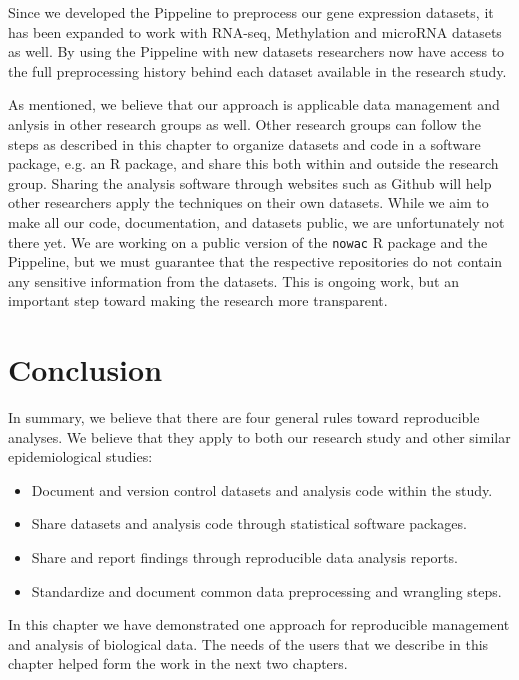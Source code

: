 Since we developed the Pippeline to preprocess our gene expression datasets, it
has been expanded to work with RNA-seq, Methylation and microRNA datasets as
well. By using the Pippeline with new datasets researchers now have access to
the full preprocessing history behind each dataset available in the research
study. 

As mentioned, we believe that our approach is applicable data management and
anlysis in other research groups as well. Other research groups can follow the
steps as described in this chapter to organize datasets and code in a software
package, e.g. an R package, and share this both within and outside the research
group. Sharing the analysis software through websites such as Github will help
other researchers apply the techniques on their own datasets. While we aim to
make all our code, documentation, and datasets public, we are unfortunately not
there yet. We are working on a public version of the \texttt{nowac} R package
and the Pippeline, but we must guarantee that the respective repositories do not
contain any sensitive information from the datasets. This is ongoing work, but
an important step toward making the research more transparent. 


\section{Conclusion}
In summary, we believe that there are four general rules toward reproducible
analyses. We believe that they apply to both our research study and other
similar epidemiological 
studies:
\begin{itemize} 
    \item Document and version control datasets and analysis code within the
        study. 
    \item Share datasets and analysis code through statistical software
        packages. 
    \item Share and report findings through reproducible data analysis reports. 
    \item Standardize and document common data preprocessing and wrangling
        steps.
\end{itemize} 

In this chapter we have demonstrated one approach for reproducible management
and analysis of biological data. The needs of the users that we describe in this
chapter helped form the work in the next two chapters. 
